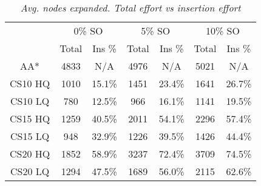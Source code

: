 \begin{table}[ht]
\caption{\small{\emph{Avg. nodes expanded. Total effort vs insertion effort}}}
\label{aha-table:searcheffort}
\begin{center}
\begin{tabular*}{0.48\textwidth}{@{\extracolsep{\fill}}ccccccc}%
  \hline
 & \multicolumn{2}{c}{\small{0\% SO}} & \multicolumn{2}{c}{\small{5\% SO}} & \multicolumn{2}{c}{\small{10\% SO}} \\
 & \small{Total} & \small{Ins \%} & \small{Total} & \small{Ins \%} & \small{Total} & \small{Ins \%} \\
  \hline
\small{AA*} & \small{4833 }& \small{N/A }& \small{4976 }& \small{N/A }& \small{5021} & \small{N/A }\\
\small{CS10 HQ }& \small{1010 }& \small{15.1\%} & \small{1451} & \small{23.4\% }& \small{1641 }& \small{26.7\% }\\
\small{CS10 LQ }& \small{780 }& \small{12.5\% }& \small{966 }& \small{16.1\% }& \small{1141 }& \small{19.5\% }\\
\small{CS15 HQ }& \small{1259 }& \small{40.5\%} & \small{2011 }& \small{54.1\% }& \small{2296 }& \small{57.4\%} \\
\small{CS15 LQ }& \small{948 }& \small{32.9\% }& \small{1226 }& \small{39.5\% }& \small{1426} & \small{44.4\% }\\
\small{CS20 HQ }& \small{1852} & \small{58.9\% }& \small{3237 }& \small{72.4\% }& \small{3709 }& \small{74.5\% }\\
\small{CS20 LQ }& \small{1294} & \small{47.5\% }& \small{1689 }& \small{56.0\% }& \small{2115 }& \small{62.6\% }\\
   \hline
\end{tabular*}
\end{center}
\end{table}
